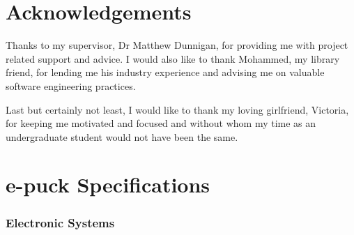 \documentclass[a4paper,12pt]{report}
\newcommand{\linespacing}{1.5}
\renewcommand{\baselinestretch}{\linespacing}
\begin{document}
\chapter*{Acknowledgements}
\renewcommand{\baselinestretch}{\linespacing}
\small\normalsize
Thanks to my supervisor, Dr Matthew Dunnigan, for providing me with project related support and advice. I would also like to thank Mohammed, my library friend, for lending me his industry experience and advising me on valuable software engineering practices. 

Last but certainly not least, I would like to thank my loving girlfriend, Victoria, for keeping me motivated and focused and without whom my time as an undergraduate student would not have been the same.




\newpage
{}
\tableofcontents


\newpage
\pagestyle{fancy}
\cfoot{\thepage}
\flushleft


%
















\clearpage
{}
{}



\appendix

\chapter{e-puck Specifications}

\subsection{Electronic Systems}
\end{document}
